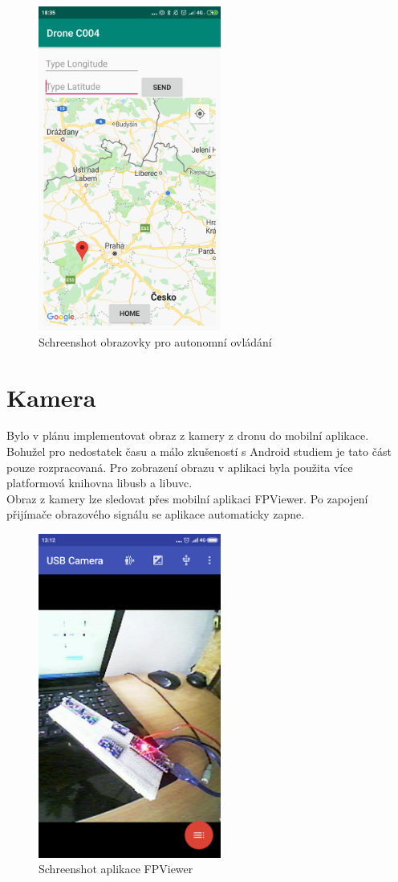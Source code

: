 \begin{figure}[H]
	\centering
	\includegraphics[width=6cm]{pictures/app2.png}
	\caption{Schreenshot obrazovky pro autonomní ovládání}
\end{figure}

\section{Kamera}
Bylo v plánu implementovat obraz z kamery z dronu do mobilní aplikace. Bohužel pro nedostatek času a málo zkušeností s Android studiem je tato část pouze rozpracovaná. Pro zobrazení obrazu v aplikaci byla použita více platformová knihovna libusb a libuvc.\\
Obraz z kamery lze sledovat přes mobilní aplikaci FPViewer. Po zapojení přijímače obrazového signálu se aplikace automaticky zapne.\\

\begin{figure}[H]
	\centering
	\includegraphics[width=6cm]{pictures/fpvscreenshot.png}
	\caption{Schreenshot aplikace FPViewer}
\end{figure}

